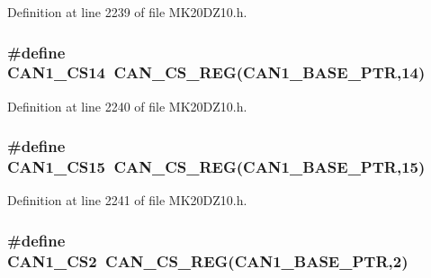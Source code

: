 Definition at line 2239 of file M\+K20\+D\+Z10.\+h.

\subsubsection[{\texorpdfstring{C\+A\+N1\+\_\+\+C\+S14}{CAN1_CS14}}]{\setlength{\rightskip}{0pt plus 5cm}\#define C\+A\+N1\+\_\+\+C\+S14~{\bf C\+A\+N\+\_\+\+C\+S\+\_\+\+R\+EG}({\bf C\+A\+N1\+\_\+\+B\+A\+S\+E\+\_\+\+P\+TR},14)}\hypertarget{group___c_a_n___register___accessor___macros_gad2579f89b970800941c95399bbd846da}{}\label{group___c_a_n___register___accessor___macros_gad2579f89b970800941c95399bbd846da}


Definition at line 2240 of file M\+K20\+D\+Z10.\+h.

\subsubsection[{\texorpdfstring{C\+A\+N1\+\_\+\+C\+S15}{CAN1_CS15}}]{\setlength{\rightskip}{0pt plus 5cm}\#define C\+A\+N1\+\_\+\+C\+S15~{\bf C\+A\+N\+\_\+\+C\+S\+\_\+\+R\+EG}({\bf C\+A\+N1\+\_\+\+B\+A\+S\+E\+\_\+\+P\+TR},15)}\hypertarget{group___c_a_n___register___accessor___macros_ga5a0dc37ab17db3b1b6162b569d00a7e6}{}\label{group___c_a_n___register___accessor___macros_ga5a0dc37ab17db3b1b6162b569d00a7e6}


Definition at line 2241 of file M\+K20\+D\+Z10.\+h.

\subsubsection[{\texorpdfstring{C\+A\+N1\+\_\+\+C\+S2}{CAN1_CS2}}]{\setlength{\rightskip}{0pt plus 5cm}\#define C\+A\+N1\+\_\+\+C\+S2~{\bf C\+A\+N\+\_\+\+C\+S\+\_\+\+R\+EG}({\bf C\+A\+N1\+\_\+\+B\+A\+S\+E\+\_\+\+P\+TR},2)}\hypertarget{group___c_a_n___register___accessor___macros_gaa05782ea08d289dff51c4512dd1a1d06}{}\label{group___c_a_n___register___accessor___macros_gaa05782ea08d289dff51c4512dd1a1d06}


